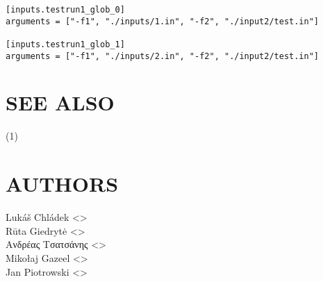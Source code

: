 \documentclass[a4paper,english]{article}
\begin{document}
\begin{adjustwidth}{18pt}{0pt}
      \begin{verbatim}
[inputs.testrun1_glob_0]
arguments = ["-f1", "./inputs/1.in", "-f2", "./input2/test.in"]

[inputs.testrun1_glob_1]
arguments = ["-f1", "./inputs/2.in", "-f2", "./input2/test.in"]
      \end{verbatim}


  \section{SEE ALSO}
      (1)

  \section{AUTHORS}
    Lukáš Chládek <>\\[0.1cm]\MANbr
    Rūta Giedrytė <>\\[0.1cm]\MANbr
    Ανδρέας Τσατσάνης <>\\[0.1cm]\MANbr
    Mikołaj Gazeel <>\\[0.1cm]\MANbr
    Jan Piotrowski <>
\end{adjustwidth}
\end{document}
